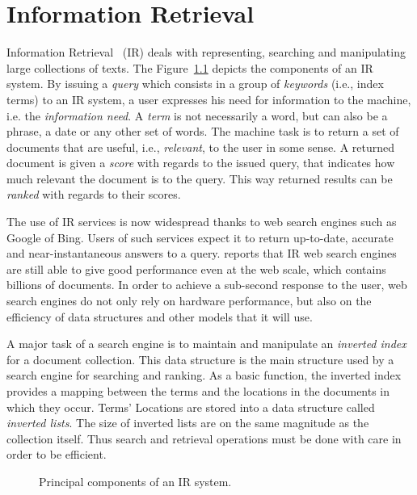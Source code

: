 \chapter{Information Retrieval}{
Information Retrieval~\cite{buttcher:2010:IR} (IR) deals with
representing, searching and manipulating large collections of texts. The
Figure~\ref{fig:IR} depicts the components of an IR system. By issuing a
\emph{query} which consists in a group of \emph{keywords} (i.e., index terms)
to an IR system, a user expresses his need for information to the machine, i.e.
the \emph{information need}. A \emph{term} is not necessarily a word, but can
also be a phrase, a date or any other set of words. The machine task is to
return a set of documents that are useful, i.e., \emph{relevant}, to the user
in some sense. A returned document is given a \emph{score} with regards to the
issued query, that indicates how much relevant the document is to the query.
This way returned results can be \emph{ranked} with regards to their scores.

The use of IR services is now widespread thanks to web search engines such as
Google of Bing. Users of such services expect it to return up-to-date, accurate
and near-instantaneous answers to a query. \cite{baeza-yates:2007:icde} reports
that IR web search engines are still able to give good performance even at the
web scale, which contains billions of documents. In order to achieve a
sub-second response to the user, web search engines do not only rely on hardware
performance, but also on the efficiency of data structures and other models that
it will use.

A major task of a search engine is to maintain and manipulate an \emph{inverted
index} for a document collection. This data structure is the main structure
used by a search engine for searching and ranking. As a basic function, the
inverted index provides a mapping between the terms and the locations in the
documents in which they occur. Terms' Locations are stored into a data
structure called \emph{inverted lists}. The size of inverted lists are on the
same magnitude as the collection itself. Thus search and retrieval operations
must be done with care in order to be efficient.

\begin{figure}
\centering
{}%
\caption{Principal components of an IR system.}
\label{fig:IR}
\end{figure}
}
\label{chap:IR}


